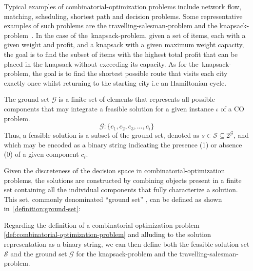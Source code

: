 Typical examples of \acrshort{combinatorial-optimization} problems include
network flow, matching, scheduling, shortest path and decision problems. Some
representative examples of such problems are the
\acrfull{travelling-salesman-problem} and the
\acrfull{knapsack-problem}~\cite{yu2010combinatorial}. In the case of
the~\acrshort{knapsack-problem}, given a set of items, each with a given weight
and profit, and a knapsack with a given maximum weight capacity, the goal is to
find the subset of items with the highest total profit that can be placed in the
knapsack without exceeding its capacity. As for the~\acrshort{knapsack-problem},
the goal is to find the shortest possible route that visits each city exactly
once whilst returning to the starting city i.e an Hamiltonian cycle.

\begin{definition}
    \label{definition:ground-set}
    The ground set $\mathcal{G}$ is a finite set of elements that represents all
    possible components that may integrate a feasible solution for a given
    instance $\iota$ of a CO problem.
    \begin{equation}
        \label{equation:ground-set}
        \mathcal{G} \colon \{c_{1}, c_{2}, c_{3}, \ldots, c_{i}\}
    \end{equation}
    Thus, a feasible solution is a subset of the ground set, denoted as $s \in
        \mathcal{S} \subseteq 2^{\mathcal{G}}$, and which may be encoded as a binary
    string indicating the presence (1) or absence (0) of a given component
    $c_{i}$.
\end{definition}

Given the discreteness of the decision space in \acrshort{combinatorial-optimization}
problems, the solutions are constructed by combining objects present in a finite set
containing all the individual components that fully characterize a solution.
This set, commonly denominated ``ground set''
\cite{outeiro2021application,festa2014brief,marti2013multistart}, can be defined
as shown in~\ref{definition:ground-set}:

Regarding the definition of a \acrshort{combinatorial-optimization} problem
\ref{def:combinatorial-optimization-problem} and alluding to the solution
representation as a binary string, we can then define both the feasible solution
set $\mathcal{S}$ and the ground set $\mathcal{G}$ for the \acrshort{knapsack-problem}
and the \acrshort{travelling-salesman-problem}.

